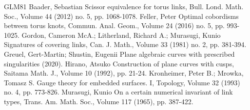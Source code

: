 \begin{thebibliography}{GLM81}
 Baader, Sebastian Scissor equivalence for torus links, Bull. Lond. Math. Soc., Volume 44 (2012) no. 5, pp. 1068-1078.
 Feller, Peter Optimal cobordisms between torus knots, Commun. Anal. Geom., Volume 24 (2016) no. 5, pp. 993-1025.
 Gordon, Cameron McA.; Litherland, Richard A.; Murasugi, Kunio Signatures of covering links, Can. J. Math., Volume 33 (1981) no. 2, pp. 381-394.
 Greuel, Gert-Martin; Shustin, Eugenii Plane algebraic curves with prescribed singularities (2020).
 Hirano, Atsuko Construction of plane curves with cusps, Saitama Math. J., Volume 10 (1992), pp. 21-24.
 Kronheimer, Peter B.; Mrowka, Tomasz S. Gauge theory for embedded surfaces. I, Topology, Volume 32 (1993) no. 4, pp. 773-826.
 Murasugi, Kunio On a certain numerical invariant of link types, Trans. Am. Math. Soc., Volume 117 (1965), pp. 387-422.
\end{thebibliography}
